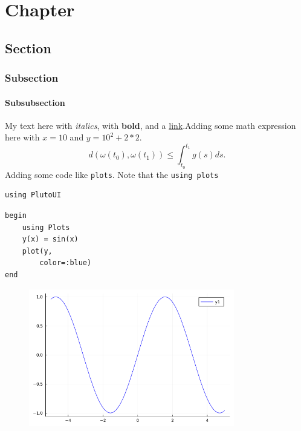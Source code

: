 \newpage

\chapter{Chapter}

\section{Section}

\subsection{Subsection}

\subsubsection{Subsubsection}
My text here with \textit{italics}, with \textbf{bold}, and a \href{https://davibarreira.github.io/}{link}.Adding some math expression here with $x=10$ and $y = 10^2 + 2*2$.
\begin{displaymath}
	d(\omega(t_0),\omega(t_1)) \leq \int^{t_1}_{t_0}g(s) ds.
\end{displaymath}
Adding some code like \lstinline[style=julia]{plots}. Note that the \lstinline[style=julia]{using plots}
\begin{lstlisting}[language=JuliaLocal, style=julia]
using PlutoUI
\end{lstlisting}

\begin{lstlisting}[language=JuliaLocal, style=julia]
begin
	using Plots
	y(x) = sin(x)
	plot(y,
		color=:blue)
end
\end{lstlisting}

\begin{figure}[H]
	\centering
	\includegraphics[width=0.8\textwidth]{./figures/examplepluto_figure1.png}
	\label{fig:examplepluto_figure1.png}

\end{figure}

